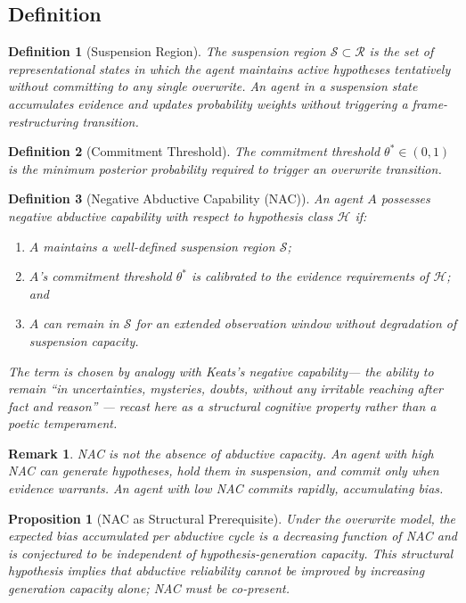 \documentclass[12pt]{article}
\newtheorem{definition}{Definition}
\newtheorem{proposition}{Proposition}
\newtheorem{remark}{Remark}
\begin{document}
\subsection{Definition}

\begin{definition}[Suspension Region]
The suspension region $\mathcal{S} \subset \mathcal{R}$ is the set of
representational states in which the agent maintains active hypotheses
tentatively without committing to any single overwrite.
An agent in a suspension state accumulates evidence and updates
probability weights without triggering a frame-restructuring transition.
\end{definition}

\begin{definition}[Commitment Threshold]
The commitment threshold $\theta^* \in (0,1)$ is the minimum posterior
probability required to trigger an overwrite transition.
\end{definition}

\begin{definition}[Negative Abductive Capability (NAC)]
\label{def:nac}
An agent $A$ possesses negative abductive capability with respect to
hypothesis class $\mathcal{H}$ if:
\begin{enumerate}
  \item $A$ maintains a well-defined suspension region $\mathcal{S}$;
  \item $A$'s commitment threshold $\theta^*$ is calibrated to the
        evidence requirements of $\mathcal{H}$; and
  \item $A$ can remain in $\mathcal{S}$ for an extended observation
        window without degradation of suspension capacity.
\end{enumerate}

The term is chosen by analogy with Keats's negative capability---
the ability to remain ``in uncertainties, mysteries, doubts, without
any irritable reaching after fact and reason'' \cite{keats1817}---
recast here as a structural cognitive property rather than a poetic
temperament.
\end{definition}

\begin{remark}
NAC is not the absence of abductive capacity.
An agent with high NAC can generate hypotheses, hold them in suspension,
and commit only when evidence warrants.
An agent with low NAC commits rapidly, accumulating bias.
\end{remark}

\begin{proposition}[NAC as Structural Prerequisite]
Under the overwrite model, the expected bias accumulated per abductive
cycle is a decreasing function of NAC and is conjectured to be
independent of hypothesis-generation capacity.
This structural hypothesis implies that abductive reliability cannot
be improved by increasing generation capacity alone; NAC must be
co-present.
\end{proposition}
\end{document}
